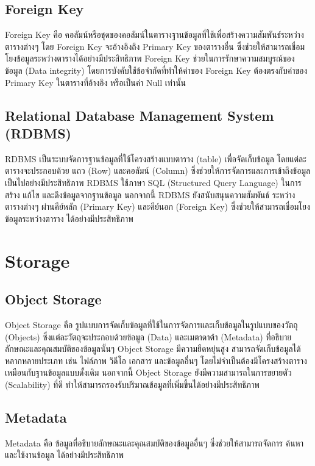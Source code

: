   \subsection{Foreign Key}
    \qquad Foreign Key คือ คอลัมน์หรือชุดของคอลัมน์ในตารางฐานข้อมูลที่ใช้เพื่อสร้างความสัมพันธ์ระหว่างตารางต่างๆ โดย
    Foreign Key จะอ้างอิงถึง Primary Key ของตารางอื่น ซึ่งช่วยให้สามารถเชื่อมโยงข้อมูลระหว่างตารางได้อย่างมีประสิทธิภาพ
    Foreign Key ช่วยในการรักษาความสมบูรณ์ของข้อมูล (Data integrity) โดยการบังคับใช้ข้อจำกัดที่ทำให้ค่าของ
    Foreign Key ต้องตรงกับค่าของ Primary Key ในตารางที่อ้างอิง หรือเป็นค่า Null เท่านั้น \cite{ForeignKey}
  \subsection{Relational Database Management System (RDBMS)}
    \qquad RDBMS เป็นระบบจัดการฐานข้อมูลที่ใช้โครงสร้างแบบตาราง (table) เพื่อจัดเก็บข้อมูล โดยแต่ละตารางจะประกอบด้วย
    แถว (Row) และคอลัมน์ (Column) ซึ่งช่วยให้การจัดการและการเข้าถึงข้อมูลเป็นไปอย่างมีประสิทธิภาพ RDBMS ใช้ภาษา SQL
    (Structured Query Language) ในการสร้าง แก้ไข และดึงข้อมูลจากฐานข้อมูล นอกจากนี้ RDBMS ยังสนับสนุนความสัมพันธ์
    ระหว่างตารางต่างๆ ผ่านคีย์หลัก (Primary Key) และคีย์นอก (Foreign Key) ซึ่งช่วยให้สามารถเชื่อมโยงข้อมูลระหว่างตาราง
    ได้อย่างมีประสิทธิภาพ \cite{RDBMS}

\section{Storage}
  \subsection{Object Storage}
    \qquad Object Storage คือ รูปแบบการจัดเก็บข้อมูลที่ใช้ในการจัดการและเก็บข้อมูลในรูปแบบของวัตถุ (Objects)
    ซึ่งแต่ละวัตถุจะประกอบด้วยข้อมูล (Data) และเมตาดาต้า (Metadata) ที่อธิบายลักษณะและคุณสมบัติของข้อมูลนั้นๆ 
    Object Storage มีความยืดหยุ่นสูง สามารถจัดเก็บข้อมูลได้หลากหลายประเภท เช่น ไฟล์ภาพ วิดีโอ เอกสาร และข้อมูลอื่นๆ
    โดยไม่จำเป็นต้องมีโครงสร้างตารางเหมือนกับฐานข้อมูลแบบดั้งเดิม นอกจากนี้ Object Storage ยังมีความสามารถในการขยายตัว
    (Scalability) ที่ดี ทำให้สามารถรองรับปริมาณข้อมูลที่เพิ่มขึ้นได้อย่างมีประสิทธิภาพ \cite{ObjectStorage}
  \subsection{Metadata}
    \qquad Metadata คือ ข้อมูลที่อธิบายลักษณะและคุณสมบัติของข้อมูลอื่นๆ ซึ่งช่วยให้สามารถจัดการ ค้นหา และใช้งานข้อมูล
    ได้อย่างมีประสิทธิภาพ \cite{Metadata}
